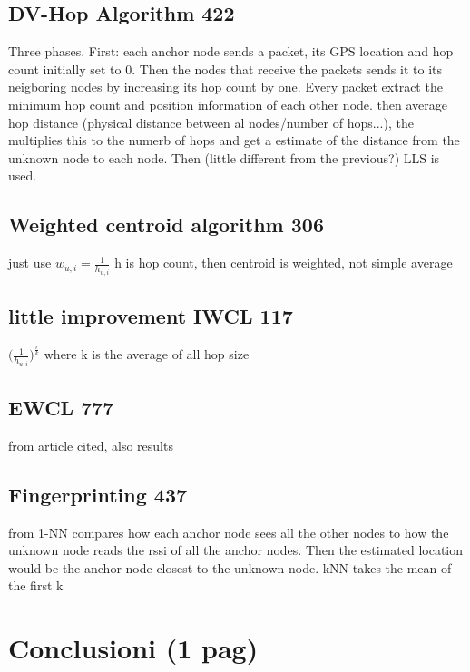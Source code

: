 \documentclass[12pt]{report}
\begin{document}
\section{DV-Hop Algorithm 422}
Three phases. First: each anchor node sends a packet, its GPS location and hop count initially set to 0. Then the nodes that receive the packets sends it to its neigboring nodes by increasing its hop count by one. Every packet extract the minimum hop count and position information of each other node. then average hop distance (physical distance between al nodes/number of hops...), the multiplies this to the numerb of hops and get a estimate of the distance from the unknown node to each node. Then (little different from the previous?) LLS is used.
\section{Weighted centroid algorithm 306}
just use $w_{u,i}=\frac{1}{h_{u,i}}$ h is hop count, then centroid is weighted, not simple average
\section{little improvement IWCL 117}
$\bigg(\frac{1}{h_{u,i}}\bigg)^{\frac{r}{k}}$
where k is the average of all hop size
\section{EWCL 777}
from article cited, also results
\section{Fingerprinting 437}
from \cite{YIU2017235} 1-NN compares how each anchor node sees all the other nodes to how the unknown node reads the rssi of all the anchor nodes. Then the estimated location would be the anchor node closest to the unknown node. kNN takes the mean of the first k 

\clearpage





\chapter{Conclusioni (1 pag)}









\clearpage
\printbibliography[
heading=bibintoc,
title={Whole bibliography}
]

\clearpage

\printbibliography[heading=subbibintoc,type=article,title={Articles only}]
\end{document}
